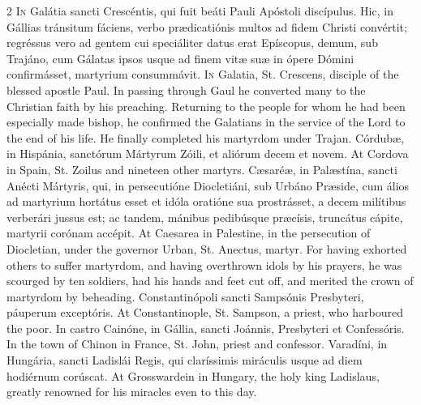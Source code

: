 \begin{paracol}{2}
\lettrine[lines=2]{I}{n} Galátia sancti 
 Crescéntis, qui fuit beáti Pauli Apóstoli discípulus. Hic, in Gállias 
 tránsitum fáciens, verbo prædicatiónis multos ad fidem Christi convértit; 
 regréssus vero ad gentem cui speciáliter datus erat Epíscopus, demum, sub 
 Trajáno, cum Gálatas ipsos usque ad finem vitæ suæ in ópere Dómini 
 confirmásset, martyrium consummávit.
\switchcolumn
{}
\lettrine[lines=2]{I}{n} Galatia, St. Crescens, disciple 
 of the blessed apostle Paul. In passing through Gaul he converted many 
 to the Christian faith by his preaching. Returning to the people for 
 whom he had been especially made bishop, he confirmed the Galatians in the 
 service of the Lord to the end of his life. He finally completed his 
 martyrdom under Trajan.
\switchcolumn*
{}
Córdubæ, in Hispánia, 
 sanctórum Mártyrum Zóili, et aliórum decem et novem.
\switchcolumn
{}
At Cordova in Spain, St. Zoilus and 
 nineteen other martyrs.
\switchcolumn*
{}
Cæsaréæ, in Palæstína, 
 sancti Anécti Mártyris, qui, in persecutióne Diocletiáni, sub Urbáno Præside, 
 cum álios ad martyrium hortátus esset et idóla oratióne sua prostrásset, a 
 decem milítibus verberári jussus est; ac tandem, mánibus pedibúsque præcísis, 
 truncátus cápite, martyrii corónam accépit.
\switchcolumn
{}
At Caesarea in Palestine, in the 
 persecution of Diocletian, under the governor Urban, St. Anectus, martyr. 
 For having exhorted others to suffer martyrdom, and having overthrown idols 
 by his prayers, he was scourged by ten soldiers, had his hands and feet cut 
 off, and merited the crown of martyrdom by beheading.
\switchcolumn*
{}
Constantinópoli sancti 
 Sampsónis Presbyteri, páuperum exceptóris.
\switchcolumn
{}
At Constantinople, St. Sampson, a 
 priest, who harboured the poor.
\switchcolumn*
{}
In castro Cainóne, in 
 Gállia, sancti Joánnis, Presbyteri et Confessóris.
\switchcolumn
{}
In the town of Chinon in France, St. 
 John, priest and confessor.
\switchcolumn*
{}
Varadíni, in Hungária, 
 sancti Ladislái Regis, qui claríssimis miráculis usque ad diem hodiérnum 
 corúscat.
\switchcolumn
{}
At Grosswardein in Hungary, the holy 
 king Ladislaus, greatly renowned for his miracles even to this day.
\switchcolumn*
{}
\end{paracol}


